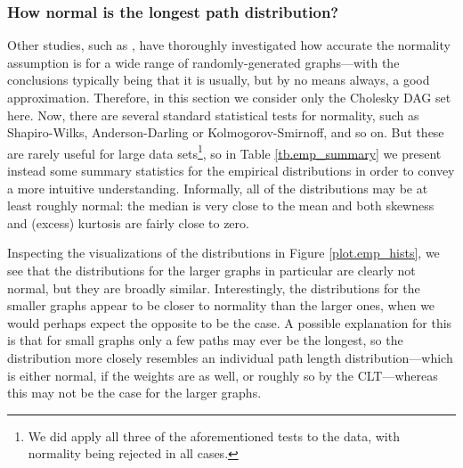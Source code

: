\documentclass[12pt]{article}
\begin{document}
\subsubsection{How normal is the longest path distribution?}
\label{subsubsect.how_normal}

Other studies, such as \cite{can16}, have thoroughly investigated how accurate the normality assumption is for a wide range of randomly-generated graphs---with the conclusions typically being that it is usually, but by no means always, a good approximation. Therefore, in this section we consider only the Cholesky DAG set here. Now, there are several standard statistical tests for normality, such as Shapiro-Wilks, Anderson-Darling or Kolmogorov-Smirnoff, and so on. But these are rarely useful for large data sets\footnote{We did apply all three of the aforementioned tests to the data, with normality being rejected in all cases.}, so in Table \ref{tb.emp_summary} we present instead some summary statistics for the empirical distributions in order to convey a more intuitive understanding. Informally, all of the distributions may be at least roughly normal: the median is very close to the mean and both skewness and (excess) kurtosis are fairly close to zero.

Inspecting the visualizations of the distributions in Figure \ref{plot.emp_hists}, we see that the distributions for the larger graphs in particular are clearly not normal, but they are broadly similar. Interestingly, the distributions for the smaller graphs appear to be closer to normality than the larger ones, when we would perhaps expect the opposite to be the case. A possible explanation for this is that for small graphs only a few paths may ever be the longest, so the distribution more closely resembles an individual path length distribution---which is either normal, if the weights are as well, or roughly so by the CLT---whereas this may not be the case for the larger graphs.  
\end{document}
